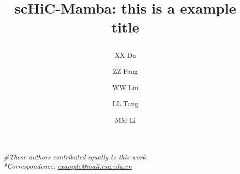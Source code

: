 \documentclass{GR}
\begin{document}

\title{
	\vspace*{0mm} %
    \doublespacing
	\vspace*{2mm}
    
	{\Huge\titlefont scHiC-Mamba: this is a example title}\\
	\vspace*{4mm}
    
	}

\doublespacing
\author[1,\#]{\mdseries\Large\authorfont XX Du}
\author[1,\#]{\mdseries\Large\authorfont ZZ Fang}
\author[1,\#]{\mdseries\Large\authorfont WW Liu}
\author[2]{\mdseries\Large\authorfont LL Tang}
\author[1,*]{\mdseries\Large\authorfont MM Li}





\maketitle

\begin{flushleft}
{\sffamily\slshape\large
{\#}These authors contributed equally to this work. \\
{*}Correspondence: \href{mailto:example@mail.csu.edu.cn}{example@mail.csu.edu.cn}
}
\vspace*{3mm}
\end{flushleft}
\end{document}
